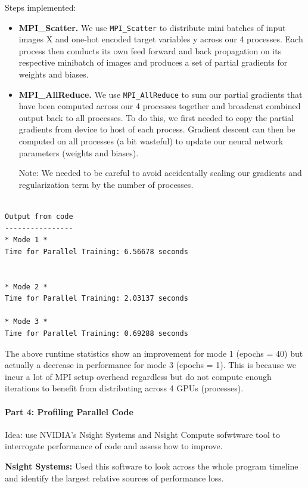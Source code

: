 \documentclass[12pt,letterpaper,twoside]{article}
\begin{document}
Steps implemented:
\begin{itemize}
    \item \textbf{MPI\_Scatter.} We use \texttt{MPI\_Scatter} to distribute mini batches
    of input images X and one-hot encoded target variables y across our 4 processes. 
    Each process then conducts its own feed forward and back propagation on its 
    respective minibatch of images and produces a set of partial gradients for 
    weights and biases.

    \item \textbf{MPI\_AllReduce.} We use \texttt{MPI\_AllReduce} to sum our partial 
    gradients that have been computed across our 4 processes together and broadcast 
    combined output back to all processes. To do this, we first needed to copy the 
    partial gradients from device to host of each process. Gradient descent can then 
    be computed on all processes (a bit wasteful) to update our neural network 
    parameters (weights and biases).

    Note: We needed to be careful to avoid accidentally scaling our gradients and 
    regularization term by the number of processes.
\end{itemize}

\begin{verbatim}

Output from code
----------------
* Mode 1 *
Time for Parallel Training: 6.56678 seconds


* Mode 2 *
Time for Parallel Training: 2.03137 seconds

* Mode 3 *
Time for Parallel Training: 0.69288 seconds
\end{verbatim}

The above runtime statistics show an improvement for mode 1 (epochs = 40) but actually
a decrease in performance for mode 3 (epochs = 1). This is because we incur a lot of
MPI setup overhead regardless but do not compute enough iterations to benefit from 
distributing across 4 GPUs (processes).


\paragraph{Part 4: Profiling Parallel Code} Idea: use NVIDIA's Nsight Systems and Nsight
Compute sofwtware tool to interrogate performance of code and assess how to improve.

\textbf{Nsight Systems:} Used this software to look across the whole program timeline 
and identify the largest relative sources of performance loss.
\end{document}
